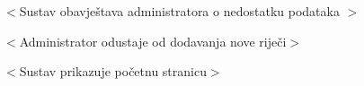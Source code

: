 \begin{packed_item}
\begin{packed_item}
\begin{packed_enum}
								\item $<$Sustav obavještava administratora o nedostatku podataka $>$
								
							\end{packed_enum}	
							
							\item[6.a] $<$Administrator odustaje od dodavanja nove riječi$>$
							\item[] \begin{packed_enum}
								
								\item $<$Sustav prikazuje početnu stranicu$>$
								
							\end{packed_enum}
							
						\end{packed_item}
					\end{packed_item}
				
